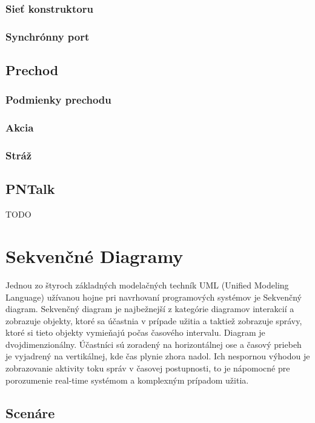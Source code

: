 \subsection{Sieť konstruktoru}

\subsection{Synchrónny port}

\section{Prechod}

\subsection{Podmienky prechodu}

\subsection{Akcia}

\subsection{Stráž}

\section{PNTalk}

TODO

\chapter{Sekvenčné Diagramy}

Jednou zo štyroch základných modelačných techník UML (Unified Modeling Language) užívanou hojne pri navrhovaní programových systémov je Sekvenčný diagram. Sekvenčný diagram je najbežnejší z kategórie diagramov interakcií a zobrazuje objekty, ktoré sa účastnia v prípade užitia a taktiež zobrazuje správy, ktoré si tieto objekty vymieňajú počas časového intervalu. Diagram je dvojdimenzionálny. Účastníci sú zoradený na horizontálnej ose a časový priebeh je vyjadrený na vertikálnej, kde čas plynie zhora nadol. Ich nespornou výhodou je zobrazovanie aktivity toku správ v časovej postupnosti, to je nápomocné pre porozumenie real-time systémom a komplexným prípadom užitia.

\section{Scenáre}

